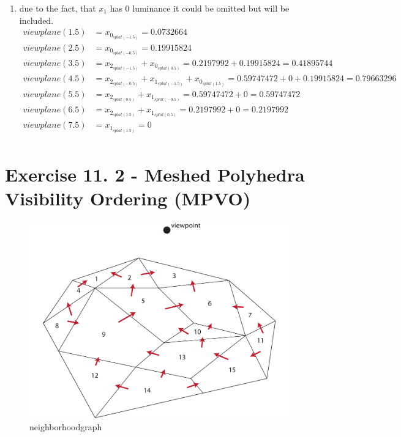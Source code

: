 \documentclass[a4paper]{article}
\begin{document}
\begin{enumerate}
	\item due to the fact, that $ x_1 $ has 0 luminance it could be omitted but will be included.
	\begin{align*}
	viewplane(1.5) &= x_{0_{splat(-1.5)}} = 0.0732664\\
	viewplane(2.5) &= x_{0_{splat(-0.5)}} = 0.19915824\\
	viewplane(3.5) &= x_{2_{splat(-1.5)}} + x_{0_{splat(0.5)}} = 0.2197992 + 0.19915824 = 0.41895744\\
	viewplane(4.5) &= x_{2_{splat(-0.5)}} + x_{1_{splat(-1.5)}} + x_{0_{splat(1.5)}} = 0.59747472 + 0 + 0.19915824 = 0.79663296\\
	viewplane(5.5) &= x_{2_{splat(0.5)}} + x_{1_{splat(-0.5)}} = 0.59747472 + 0 = 0.59747472\\
	viewplane(6.5) &= x_{2_{splat(1.5)}} + x_{1_{splat(0.5)}} = 0.2197992 + 0 = 0.2197992\\
	viewplane(7.5) &= x_{1_{splat(1.5)}} = 0\\
	\end{align*}
\end{enumerate}


\newpage
\section*{Exercise 11. 2 - Meshed Polyhedra Visibility Ordering (MPVO)}

\begin{figure}[!ht]
	\centering
	\includegraphics[width=0.7\linewidth]{neighborhoodGraph}
	\caption{neighborhoodgraph}
	\label{fig:neighborhoodgraph}
\end{figure}
\end{document}
